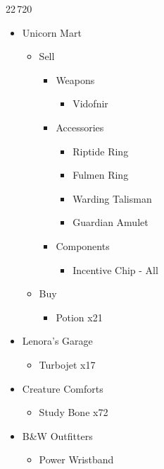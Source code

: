 \begin{shop}{22\,720}
\begin{multicols}{2}
\begin{itemize}
    \item Unicorn Mart
    \begin{itemize}
        \item Sell
        \begin{itemize}
            \item Weapons
            \begin{itemize}
                \item Vidofnir
            \end{itemize}
            \item Accessories
            \begin{itemize}
                \item Riptide Ring
                \item Fulmen Ring
                \item Warding Talisman
                \item Guardian Amulet
            \end{itemize}
            \item Components
            \begin{itemize}
                \item Incentive Chip - All
            \end{itemize}
        \end{itemize}
        \item Buy
        \begin{itemize}
            \item Potion x21
        \end{itemize}
    \end{itemize}
    \columnbreak
    \item Lenora's Garage
    \begin{itemize}
        \item Turbojet x17
    \end{itemize}
    \item Creature Comforts
    \begin{itemize}
        \item Study Bone x72
    \end{itemize}
    \item B\&W Outfitters
    \begin{itemize}
        \item Power Wristband
    \end{itemize}
\end{itemize}
\end{multicols}
\end{shop}
